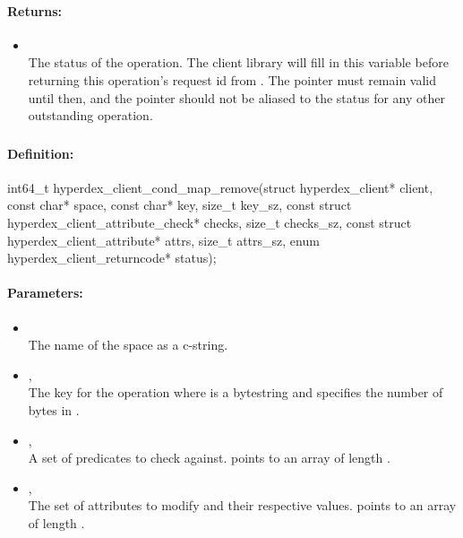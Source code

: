 \paragraph{Returns:}
\begin{itemize}[noitemsep]
\item {}\\
The status of the operation.  The client library will fill in this variable before returning this operation's request id from .  The pointer must remain valid until then, and the pointer should not be aliased to the status for any other outstanding operation.
\end{itemize}

\pagebreak
\subsubsection{}
\label{api:c:cond_map_remove}


\paragraph{Definition:}
\begin{ccode}
int64_t hyperdex_client_cond_map_remove(struct hyperdex_client* client,
        const char* space,
        const char* key, size_t key_sz,
        const struct hyperdex_client_attribute_check* checks, size_t checks_sz,
        const struct hyperdex_client_attribute* attrs, size_t attrs_sz,
        enum hyperdex_client_returncode* status);
\end{ccode}

\paragraph{Parameters:}
\begin{itemize}[noitemsep]
\item {}\\
The name of the space as a c-string.
\item {}, \\
The key for the operation where  is a bytestring and  specifies the number of bytes in .
\item {}, \\
A set of predicates to check against.   points to an array of length .
\item {}, \\
The set of attributes to modify and their respective values.   points to an array of length .
\end{itemize}

